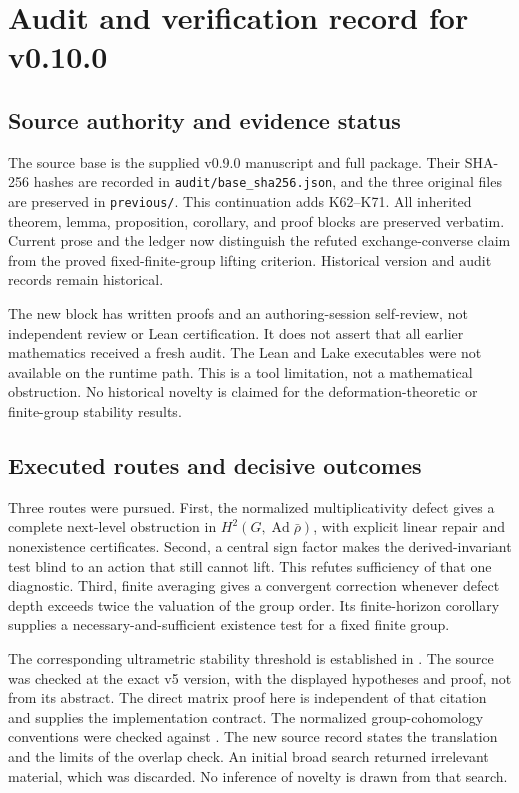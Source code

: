 \clearpage
\section{Audit and verification record for v0.10.0}\label{app:audit-v0100}

\subsection{Source authority and evidence status}
The source base is the supplied v0.9.0 manuscript and full package. Their SHA-256 hashes are recorded in \texttt{audit/base\_sha256.json}, and the three original files are preserved in \texttt{previous/}. This continuation adds K62--K71. All inherited theorem, lemma, proposition, corollary, and proof blocks are preserved verbatim. Current prose and the ledger now distinguish the refuted exchange-converse claim from the proved fixed-finite-group lifting criterion. Historical version and audit records remain historical.

The new block has written proofs and an authoring-session self-review, not independent review or Lean certification. It does not assert that all earlier mathematics received a fresh audit. The Lean and Lake executables were not available on the runtime path. This is a tool limitation, not a mathematical obstruction. No historical novelty is claimed for the deformation-theoretic or finite-group stability results.

\subsection{Executed routes and decisive outcomes}
Three routes were pursued. First, the normalized multiplicativity defect gives a complete next-level obstruction in $H^2(G,\operatorname{Ad}\bar\rho)$, with explicit linear repair and nonexistence certificates. Second, a central sign factor makes the derived-invariant test blind to an action that still cannot lift. This refutes sufficiency of that one diagnostic. Third, finite averaging gives a convergent correction whenever defect depth exceeds twice the valuation of the group order. Its finite-horizon corollary supplies a necessary-and-sufficient existence test for a fixed finite group.

The corresponding ultrametric stability threshold is established in \cite[Lemma 7.3]{FournierFacio2026}. The source was checked at the exact v5 version, with the displayed hypotheses and proof, not from its abstract. The direct matrix proof here is independent of that citation and supplies the implementation contract. The normalized group-cohomology conventions were checked against \cite[Chapter II, 1.17--1.19]{MilneCFT2020}. The new source record states the translation and the limits of the overlap check. An initial broad search returned irrelevant material, which was discarded. No inference of novelty is drawn from that search.

